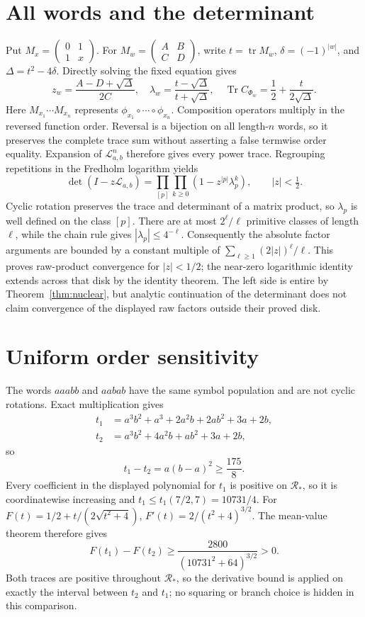 \documentclass[11pt]{article}
\newcommand{\Lop}{\mathcal L}
\begin{document}
\section{All words and the determinant}
Put $M_x=\left(\begin{smallmatrix}0&1\\1&x\end{smallmatrix}\right)$.
For $M_w=\left(\begin{smallmatrix}A&B\\C&D\end{smallmatrix}\right)$,
write $t=\operatorname{tr}M_w$, $\delta=(-1)^{|w|}$, and
$\Delta=t^2-4\delta$.  Directly solving the fixed equation gives
\[
 z_w=\frac{A-D+\sqrt\Delta}{2C},\quad
 \lambda_w=\frac{t-\sqrt\Delta}{t+\sqrt\Delta},\quad
 \operatorname{Tr}C_{\Phi_w}=\frac12+\frac{t}{2\sqrt\Delta}.
\]
Here $M_{x_1}\cdots M_{x_n}$ represents
$\phi_{x_1}\circ\cdots\circ\phi_{x_n}$.  Composition operators multiply in
the reversed function order.  Reversal is a bijection on all length-$n$
words, so it preserves the complete trace sum without asserting a false
termwise order equality.  Expansion of $\Lop_{a,b}^n$ therefore gives every
power trace.  Regrouping
repetitions in the Fredholm logarithm yields
\begin{equation}\label{eq:product}
 \det(I-z\Lop_{a,b})=\prod_{[p]}\prod_{k\ge0}
 (1-z^{|p|}\lambda_p^k),\qquad |z|<\tfrac12 .
\end{equation}
Cyclic rotation preserves the trace and determinant of a matrix product, so
$\lambda_p$ is well defined on the class $[p]$.  There are at most
$2^\ell/\ell$ primitive classes of length $\ell$, while the chain rule gives
$|\lambda_p|\le4^{-\ell}$.  Consequently the absolute factor arguments are
bounded by a constant multiple of
$\sum_{\ell\ge1}(2|z|)^\ell/\ell$.  This proves raw-product convergence for
$|z|<1/2$; the near-zero logarithmic identity extends across that disk by
the identity theorem.  The left side is entire by
Theorem~\ref{thm:nuclear}, but analytic continuation of the determinant does
not claim convergence of the displayed raw factors outside their proved
disk.

\section{Uniform order sensitivity}
The words $aaabb$ and $aabab$ have the same symbol population and are not
cyclic rotations.  Exact multiplication gives
\begin{align*}
 t_1&=a^3b^2+a^3+2a^2b+2ab^2+3a+2b,\\
 t_2&=a^3b^2+4a^2b+ab^2+3a+2b,
\end{align*}
so
\[
 t_1-t_2=a(b-a)^2\ge\frac{175}{8}.
\]
Every coefficient in the displayed polynomial for $t_1$ is positive on
$\mathcal R_*$, so it is coordinatewise increasing and
$t_1\le t_1(7/2,7)=10731/4$.  For
$F(t)=1/2+t/(2\sqrt{t^2+4})$,
$F'(t)=2/(t^2+4)^{3/2}$.  The mean-value theorem therefore gives
\[
 F(t_1)-F(t_2)\ge
 \frac{2800}{(10731^2+64)^{3/2}}>0.
\]
Both traces are positive throughout $\mathcal R_*$, so the derivative bound
is applied on exactly the interval between $t_2$ and $t_1$; no squaring or
branch choice is hidden in this comparison.
\end{document}
